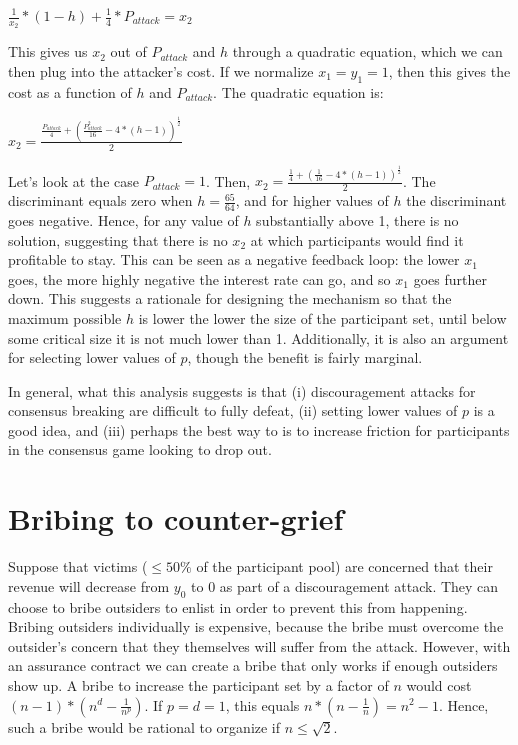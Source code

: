\documentclass[12pt]{article}
\begin{document}
$\frac{1}{x_2} * (1-h) + \frac{1}{4} * P_{attack} = x_2$

This gives us $x_2$ out of $P_{attack}$ and $h$ through a quadratic equation, which we can then plug into the attacker's cost. If we normalize $x_1 = y_1 = 1$, then this gives the cost as a function of $h$ and $P_{attack}$. The quadratic equation is:

$x_2 = \frac{\frac{P_{attack}}{4} + (\frac{P_{attack}^2}{16} - 4 * (h-1))^{\frac{1}{2}}}{2}$

Let's look at the case $P_{attack} = 1$. Then, $x_2 = \frac{\frac{1}{4} + (\frac{1}{16} - 4 * (h-1))^{\frac{1}{2}}}{2}$. The discriminant equals zero when $h = \frac{65}{64}$, and for higher values of $h$ the discriminant goes negative. Hence, for any value of $h$ substantially above 1, there is no solution, suggesting that there is no $x_2$ at which participants would find it profitable to stay. This can be seen as a negative feedback loop: the lower $x_1$ goes, the more highly negative the interest rate can go, and so $x_1$ goes further down. This suggests a rationale for designing the mechanism so that the maximum possible $h$ is lower the lower the size of the participant set, until below some critical size it is not much lower than 1. Additionally, it is also an argument for selecting lower values of $p$, though the benefit is fairly marginal.

In general, what this analysis suggests is that (i) discouragement attacks for consensus breaking are difficult to fully defeat, (ii) setting lower values of $p$ is a good idea, and (iii) perhaps the best way to is to increase friction for participants in the consensus game looking to drop out.

\section{Bribing to counter-grief}

Suppose that victims ($\le 50\%$ of the participant pool) are concerned that their revenue will decrease from $y_0$ to 0 as part of a discouragement attack. They can choose to bribe outsiders to enlist in order to prevent this from happening. Bribing outsiders individually is expensive, because the bribe must overcome the outsider's concern that they themselves will suffer from the attack. However, with an assurance contract we can create a bribe that only works if enough outsiders show up. A bribe to increase the participant set by a factor of $n$ would cost $(n - 1) * (n^d - \frac{1}{n^p})$. If $p = d = 1$, this equals $n * (n - \frac{1}{n}) = n^2 - 1$. Hence, such a bribe would be rational to organize if $n \le \sqrt{2}$.
\end{document}
